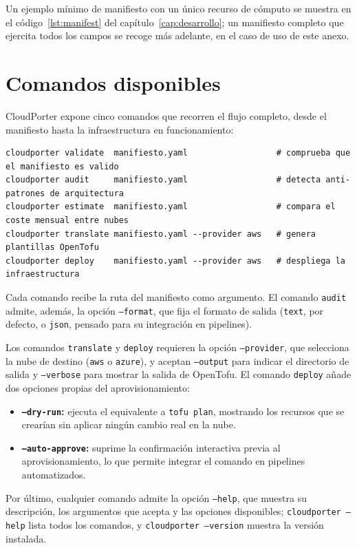 Un ejemplo mínimo de manifiesto con un único recurso de cómputo se muestra en el
código~\ref{lst:manifest} del capítulo~\ref{cap:desarrollo}; un manifiesto completo que ejercita
todos los campos se recoge más adelante, en el caso de uso de este anexo.

\section*{Comandos disponibles}

CloudPorter expone cinco comandos que recorren el flujo completo, desde el manifiesto hasta la
infraestructura en funcionamiento:

\begin{lstlisting}
cloudporter validate  manifiesto.yaml                  # comprueba que el manifiesto es valido
cloudporter audit     manifiesto.yaml                  # detecta anti-patrones de arquitectura
cloudporter estimate  manifiesto.yaml                  # compara el coste mensual entre nubes
cloudporter translate manifiesto.yaml --provider aws   # genera plantillas OpenTofu
cloudporter deploy    manifiesto.yaml --provider aws   # despliega la infraestructura
\end{lstlisting}

Cada comando recibe la ruta del manifiesto como argumento. El comando \texttt{audit} admite, además,
la opción \texttt{--format}, que fija el formato de salida (\texttt{text}, por defecto, o
\texttt{json}, pensado para su integración en pipelines).

Los comandos \texttt{translate} y \texttt{deploy} requieren la opción \texttt{--provider}, que
selecciona la nube de destino (\texttt{aws} o \texttt{azure}), y aceptan \texttt{--output} para
indicar el directorio de salida y \texttt{--verbose} para mostrar la salida de OpenTofu. El comando
\texttt{deploy} añade dos opciones propias del aprovisionamiento:

\begin{itemize}
    \item \textbf{\texttt{--dry-run}:} ejecuta el equivalente a \texttt{tofu plan}, mostrando los
    recursos que se crearían sin aplicar ningún cambio real en la nube.
    \item \textbf{\texttt{--auto-approve}:} suprime la confirmación interactiva previa al
    aprovisionamiento, lo que permite integrar el comando en pipelines automatizados.
\end{itemize}

Por último, cualquier comando admite la opción \texttt{--help}, que muestra su descripción, los
argumentos que acepta y las opciones disponibles; \texttt{cloudporter --help} lista todos los
comandos, y \texttt{cloudporter --version} muestra la versión instalada.

